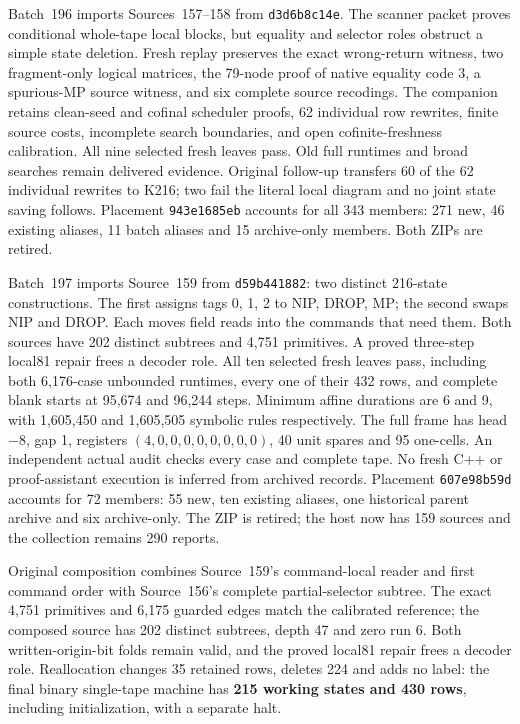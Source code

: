 \documentclass[11pt]{article}
\begin{document}
{Batch~196 imports Sources~157--158 from \texttt{d3d6b8c14e}. The scanner
packet proves conditional whole-tape local blocks, but equality and selector
roles obstruct a simple state deletion. Fresh replay preserves the exact
wrong-return witness, two fragment-only logical matrices, the 79-node proof
of native equality code 3, a spurious-MP source witness, and six complete
source recodings. The companion retains clean-seed and cofinal scheduler
proofs, 62 individual row rewrites, finite source costs, incomplete search
boundaries, and open cofinite-freshness calibration. All nine selected fresh
leaves pass. Old full runtimes and broad searches remain delivered evidence.
Original follow-up transfers 60 of the 62 individual rewrites to K216;
two fail the literal local diagram and no joint state saving follows.
Placement \texttt{943e1685eb} accounts for all 343 members: 271 new, 46 existing
aliases, 11 batch aliases and 15 archive-only members. Both ZIPs are retired.

Batch~197 imports Source~159 from \texttt{d59b441882}: two distinct 216-state
constructions. The first assigns tags 0, 1, 2 to NIP, DROP, MP; the second swaps NIP and
DROP. Each moves field reads into the commands that need them. Both sources have 202 distinct
subtrees and 4,751 primitives. A proved three-step local81 repair frees a
decoder role. All ten selected fresh leaves pass, including both 6,176-case
unbounded runtimes, every one of their 432 rows, and complete blank starts
at 95,674 and 96,244 steps. Minimum affine durations are 6 and 9, with
1,605,450 and 1,605,505 symbolic rules respectively. The full frame has head
$-8$, gap 1, registers $(4,0,0,0,0,0,0,0,0)$, 40 unit spares and 95 one-cells.
An independent actual audit checks every case and complete tape. No fresh
C++ or proof-assistant execution is inferred from archived records.
Placement \texttt{607e98b59d} accounts for 72 members: 55 new, ten existing
aliases, one historical parent archive and six archive-only. The ZIP is
retired; the host now has 159 sources and the collection remains 290 reports.

Original composition combines Source~159's command-local reader and first
command order with Source~156's complete partial-selector subtree. The exact
4,751 primitives and 6,175 guarded edges match the calibrated reference;
the composed source has 202 distinct subtrees, depth 47 and zero run 6.
Both written-origin-bit folds remain valid, and the proved local81 repair
frees a decoder role. Reallocation changes 35 retained rows, deletes 224 and
adds no label: the final binary single-tape machine has \textbf{215 working
states and 430 rows}, including initialization, with a separate halt.

}
\end{document}
